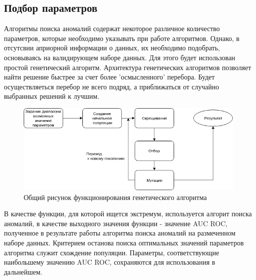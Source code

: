 \subsection{Подбор параметров}
Алгоритмы поиска аномалий содержат некоторое различное количество параметров, которые необходимо указывать при работе алгоритмов. Однако, в отсутсвии априорной информации о данных, их необходимо подобрать, основываясь на валидирующем наборе данных. \cite{Book17}
Для этого будет использован простой генетический алгоритм.
Архитектура генетических алгоритмов позволяет найти решение быстрее за счет более 'осмысленного' перебора. Будет осуществляеться перебор не всего подряд, а приближаться от случайно выбранных решений к лучшим.
\begin{figure}
	\centering
	\includegraphics[width=.8\textwidth]{diagrams/diagram1.png}
	\caption{ Общий рисунок функционирования генетического алгоритма}
	\label{fig09}
\end{figure}
В качестве функции, для которой ищется экстремум, используется алгорит поиска аномалий, в качестве выходного значения функции - значение AUC ROC, полученное в результате работы алгоритма поиска аномалий на размеченном наборе данных. Критерием останова поиска оптимальных значений параметров алгоритма служит схождение популяции.
 Параметры, соответствующие наибольшему значению AUC ROC, сохраняются для использования в дальнейшем. 

